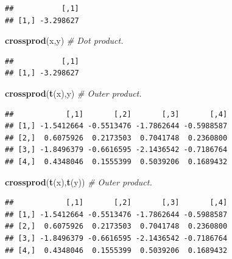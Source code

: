 \documentclass[]{book}
\newenvironment{Shaded}{\begin{snugshade}}{\end{snugshade}}
\newcommand{\KeywordTok}[1]{\textcolor[rgb]{0.13,0.29,0.53}{\textbf{#1}}}
\newcommand{\StringTok}[1]{\textcolor[rgb]{0.31,0.60,0.02}{#1}}
\newcommand{\CommentTok}[1]{\textcolor[rgb]{0.56,0.35,0.01}{\textit{#1}}}
\newcommand{\OperatorTok}[1]{\textcolor[rgb]{0.81,0.36,0.00}{\textbf{#1}}}
\newcommand{\NormalTok}[1]{#1}
\theoremstyle{definition}
\theoremstyle{definition}
\theoremstyle{definition}
\theoremstyle{remark}
\begin{document}
\begin{Shaded}
\end{Shaded}

\begin{verbatim}
##           [,1]
## [1,] -3.298627
\end{verbatim}

\begin{Shaded}
\begin{Highlighting}[]
\KeywordTok{crossprod}\NormalTok{(x,y) }\CommentTok{# Dot product.}
\end{Highlighting}
\end{Shaded}

\begin{verbatim}
##           [,1]
## [1,] -3.298627
\end{verbatim}

\begin{Shaded}
\begin{Highlighting}[]
\KeywordTok{crossprod}\NormalTok{(}\KeywordTok{t}\NormalTok{(x),y) }\CommentTok{# Outer product.}
\end{Highlighting}
\end{Shaded}

\begin{verbatim}
##            [,1]       [,2]       [,3]       [,4]
## [1,] -1.5412664 -0.5513476 -1.7862644 -0.5988587
## [2,]  0.6075926  0.2173503  0.7041748  0.2360800
## [3,] -1.8496379 -0.6616595 -2.1436542 -0.7186764
## [4,]  0.4348046  0.1555399  0.5039206  0.1689432
\end{verbatim}

\begin{Shaded}
\begin{Highlighting}[]
\KeywordTok{crossprod}\NormalTok{(}\KeywordTok{t}\NormalTok{(x),}\KeywordTok{t}\NormalTok{(y)) }\CommentTok{# Outer product.}
\end{Highlighting}
\end{Shaded}

\begin{verbatim}
##            [,1]       [,2]       [,3]       [,4]
## [1,] -1.5412664 -0.5513476 -1.7862644 -0.5988587
## [2,]  0.6075926  0.2173503  0.7041748  0.2360800
## [3,] -1.8496379 -0.6616595 -2.1436542 -0.7186764
## [4,]  0.4348046  0.1555399  0.5039206  0.1689432
\end{verbatim}
\end{document}
